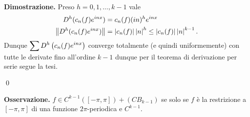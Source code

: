 

\textbf{Dimostrazione.} Preso $h=0,1,\ldots,k-1$ vale
\begin{align*}
	D^h (c_n(f) e^{inx}) & = c_n(f) (in)^h e^{inx} \\
	\left\lVert D^h (c_n(f) e^{inx}) \right\rVert & = \left| c_n(f) \right| \left| n \right|^h \leq \left| c_n(f) \right| \left| n \right|^{k-1}.
\end{align*}
Dunque $\displaystyle \sum D^h \left( c_n(f) e^{inx} \right)$ converge totalmente (e quindi uniformemente) con tutte le derivate fino all'ordine $k-1$ dunque per il teorema di derivazione per serie segue la tesi.




\qed

\vs

\textbf{Osservazione.} $f \in C^{k-1}([-\pi,\pi]) + (CB_{k-1})$ se solo se $f $ è la restrizione a $[-\pi,\pi]$ di una funzione $2\pi$-periodica e $C^{k-1}$.


